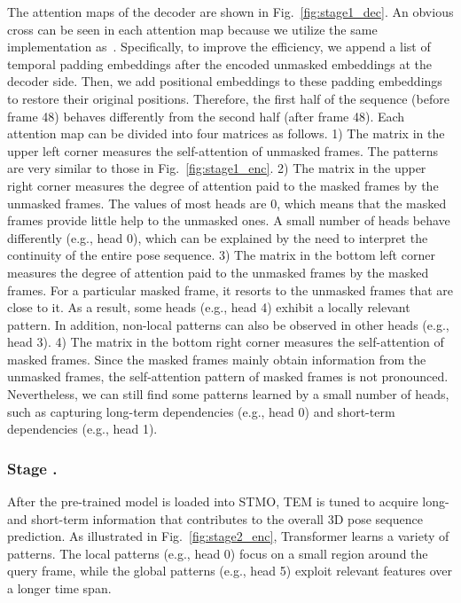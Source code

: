 \documentclass[]{llncs}
\newcommand{\RNum}[1]{\uppercase\expandafter{\romannumeral #1\relax}}
\begin{document}
The attention maps of the decoder are shown in Fig.~\ref{fig:stage1_dec}. An obvious cross can be seen in each attention map because we utilize the same implementation as~\cite{he2022masked}. Specifically, to improve the efficiency, we append a list of temporal padding embeddings after the encoded unmasked embeddings at the decoder side. Then, we add positional embeddings to these padding embeddings to restore their original positions. Therefore, the first half of the sequence (before frame 48) behaves differently from the second half (after frame 48). Each attention map can be divided into four matrices as follows. 1) The matrix  in the upper left corner measures the self-attention of unmasked frames. The patterns are very similar to those in Fig.~\ref{fig:stage1_enc}. 2) The matrix  in the upper right corner measures the degree of attention paid to the masked frames by the unmasked frames. The values of most heads are 0, which means that the masked frames provide little help to the unmasked ones. A small number of heads behave differently (e.g., head 0), which can be explained by the need to interpret the continuity of the entire pose sequence. 3) The matrix  in the bottom left corner measures the degree of attention paid to the unmasked frames by the masked frames. For a particular masked frame, it resorts to the unmasked frames that are close to it. As a result, some heads (e.g., head 4) exhibit a locally relevant pattern. In addition, non-local patterns can also be observed in other heads (e.g., head 3). 4) The matrix  in the bottom right corner measures the self-attention of masked frames. Since the masked frames mainly obtain information from the unmasked frames, the self-attention pattern of masked frames is not pronounced. Nevertheless, we can still find some patterns learned by a small number of heads, such as capturing long-term dependencies (e.g., head 0) and short-term dependencies (e.g., head 1).











\subsubsection{Stage \RNum{2}.}
After the pre-trained model is loaded into STMO, TEM is tuned to acquire long- and short-term information that contributes to the overall 3D pose sequence prediction. As illustrated in Fig.~\ref{fig:stage2_enc}, Transformer learns a variety of patterns. The local patterns (e.g., head 0) focus on a small region around the query frame, while the global patterns (e.g., head 5) exploit relevant features over a longer time span.
\end{document}
